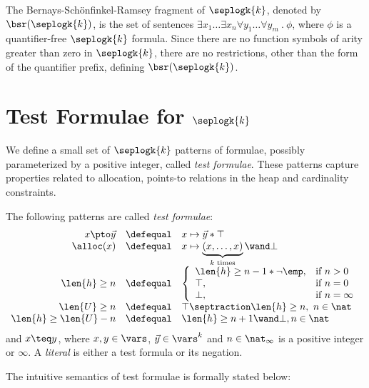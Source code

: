 The Bernays-Sch\"onfinkel-Ramsey fragment of $\seplogk{k}$, denoted by
$\bsr(\seplogk{k})$, is the set of sentences $\exists x_1 \ldots
\exists x_n \forall y_1 \ldots \forall y_m ~.~ \phi$, where $\phi$ is
a quantifier-free $\seplogk{k}$ formula. Since there are no function
symbols of arity greater than zero in $\seplogk{k}$, there are no
restrictions, other than the form of the quantifier prefix, defining
$\bsr(\seplogk{k})$.

\section{Test Formulae for $\seplogk{k}$}
\label{sec:test-formulae}

We define a small set of $\seplogk{k}$ patterns of formulae, possibly
parameterized by a positive integer, called \emph{test
  formulae}. These patterns capture properties related to allocation,
points-to relations in the heap and cardinality constraints.
\begin{definition}\label{def:test-formulae}
The following patterns are called \emph{test formulae}:
\[\begin{array}{rcl}
x \pto \vec{y} & \defequal & x \mapsto \vec{y} * \top \\
\alloc(x) & \defequal & x \mapsto \underbrace{(x,\ldots,x)}_{k \text{ times}} \wand \bot \\
\len{h} \geq n & \defequal & \left\{\begin{array}{ll}
\len{h} \geq n-1 * \neg\emp, & \text{if $n>0$} \\
\top, & \text{if $n = 0$} \\
\bot, & \text{if $n = \infty$}
\end{array}\right. \\
\len{U} \geq n & \defequal & \top \septraction \len{h} \geq n,~ n \in \nat \\
\len{h} \geq \len{U} - n & \defequal & \len{h} \geq n + 1 \wand \bot, n \in \nat \\
\end{array}\]
and $x \teq y$, where $x,y \in \vars$, $\vec{y} \in \vars^k$ and $n
\in \nat_\infty$ is a positive integer or $\infty$. A \emph{literal}
is either a test formula or its negation.
\end{definition}
The intuitive semantics of test formulae is formally stated below:

